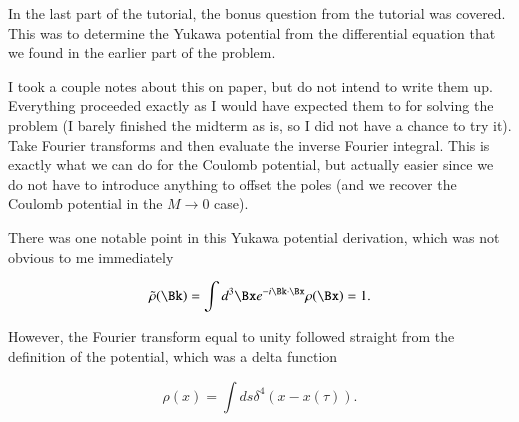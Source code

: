 %
%


In the last part of the tutorial, the bonus question from the tutorial was covered.  This was to determine the Yukawa potential from the differential equation that we found in the earlier part of the problem.

I took a couple notes about this on paper, but do not intend to write them up.  Everything proceeded exactly as I would have expected them to for solving the problem (I barely finished the midterm as is, so I did not have a chance to try it).  Take Fourier transforms and then evaluate the inverse Fourier integral.  This is exactly what we can do for the Coulomb potential, but actually easier since we do not have to introduce anything to offset the poles (and we recover the Coulomb potential in the \(M \rightarrow 0\) case).

There was one notable point in this Yukawa potential derivation, which was not obvious to me immediately

\begin{equation}\label{eqn:relativisticElectrodynamicsT8:350}
\tilde{\rho}(\Bk) = \int d^3 \Bx e^{-i \Bk \cdot \Bx} \rho(\Bx) = 1.
\end{equation}

However, the Fourier transform equal to unity followed straight from the definition of the potential, which was a delta function

\begin{equation}\label{eqn:relativisticElectrodynamicsT8:340}
\rho(x) = \int ds \delta^4(x - x(\tau)).
\end{equation}
